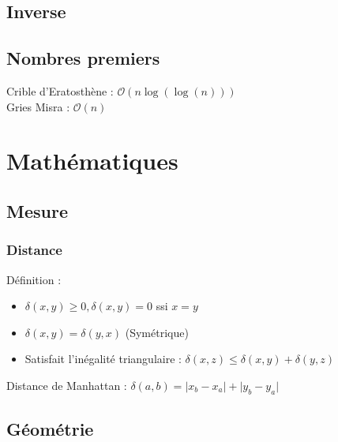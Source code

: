 \documentclass[8pt]{article}
\begin{document}
        \subsection{Inverse}
        {\scriptsize}
        \subsection{Nombres premiers}
        Crible d'Eratosthène : $\mathcal{O}(n \log(\log(n)))$ \\
        Gries Misra : $\mathcal{O}(n)$
        {\scriptsize}
    \section{Mathématiques}
        \subsection{Mesure}
            \subsubsection{Distance}
            Définition : 
            \begin{itemize}
                \item $\delta(x,y) \geq 0, \delta(x,y) = 0$ ssi $x=y$
                \item $\delta(x,y) = \delta(y,x)$ (Symétrique)
                \item Satisfait l'inégalité triangulaire : $\delta(x,z) \leq \delta(x,y) + \delta(y,z)$
            \end{itemize}
            Distance de Manhattan :
            $\delta(a,b) = \lvert x_b-x_a \rvert + \lvert y_b-y_a \rvert$
        \subsection{Géométrie}
\end{document}
